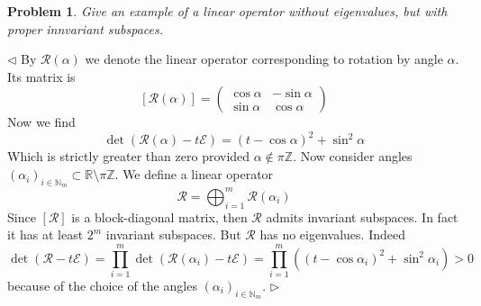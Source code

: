 \documentclass[12pt]{article}
\newtheorem{problem}{Problem}[subsection]
\newenvironment{solution}{\par $\triangleleft$}{$\triangleright$}
\begin{document}
\begin{problem} Give an example of a linear operator without eigenvalues, but
with proper innvariant subspaces.
\end{problem}
\begin{solution} By $\mathcal{R}(\alpha)$ we denote the linear operator
    corresponding to rotation by angle $\alpha$. Its matrix is
    $$
        [ \mathcal{R}(\alpha)]
        =\begin{pmatrix}
            \cos\alpha & -\sin\alpha \\
            \sin\alpha & \cos\alpha
        \end{pmatrix}
    $$
    Now we find
    $$
        \det(\mathcal{R(\alpha)}-t\mathcal{E})={(t-\cos\alpha)}^2+\sin^2\alpha
    $$
    Which is strictly greater than zero provided $\alpha\notin\pi \mathbb{Z}$.
    Now consider angles
    ${(\alpha_i)}_{i\in\mathbb{N}_m}\subset\mathbb{R}\setminus\pi\mathbb{Z}$. We
    define a linear operator
    $$
        \mathcal{R}=\bigoplus_{i=1}^m\mathcal{R}(\alpha_i)
    $$
    Since $[\mathcal{R}]$ is a block-diagonal matrix, then $\mathcal{R}$ admits
    invariant subspaces. In fact it has at least $2^m$ invariant subspaces. But
    $\mathcal{R}$ has no eigenvalues. Indeed
    $$
        \det(\mathcal{R}-t\mathcal{E})
        =\prod_{i=1}^m\det(\mathcal{R}(\alpha_i)-t\mathcal{E})
        =\prod_{i=1}^m({(t-\cos\alpha_i)}^2+\sin^2\alpha_i)>0
    $$
    because of the choice of the angles ${(\alpha_i)}_{i\in\mathbb{N}_m}$.
\end{solution}
\end{document}
